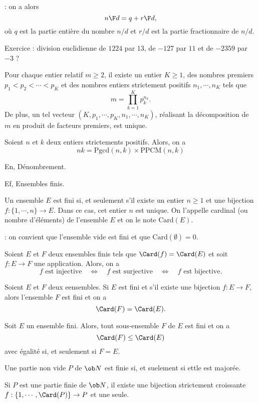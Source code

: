 \Remarque : on a alors 
$$
{n\F d}=q+{r\F d}, 
$$
où $q$ est la partie entière du nombre $n/d$ et $r/d$ est la partie fractionnaire de $n/d$. 
\bigskip

Exercice :  division euclidienne de $1224$ par $13$, de $-127$ par $11$ et de $-2359$ par $-3$ ? 
\bigskip

\Theoreme [Title=Décomposition en facteurs premiers] Pour chaque entier relatif $m\ge2$, il existe un entier $K\ge1$, 
des nombres premiers $p_1<p_2< \cdots< p_K$ et des nombres entiers strictement positifs $n_1,\cdots, n_K$ tels que 
$$
m=\prod_{k=1}^K p_k^{n_k}. 
$$
De plus, un tel vecteur $(K,p_1,\cdots, p_K, n_1,\cdots,n_K)$, réalisant la décomposition de $m$ en produit de facteurs premiers, est unique. 
\bigskip

\Propriete []  Soient $n$ et $k$ deux entiers strictements positifs. Alors, on a
$$
nk=\mbox{Pgcd}(n,k)\times \mbox{PPCM}(n,k)
$$ 

\Section En, Dénombrement. 

\Subsection Ef, Ensembles finis. 

\Definition []  Un ensemble $E$ est fini si, et seulement s'il existe un entier $n\ge1$ et une bijection $f:\{1,\cdots, n\}\to E$. 
Dans ce cas, cet entier $n$ est unique. On l'appelle cardinal (ou nombre d'éléments) de l'ensemble $E$ et on le note $\mbox{Card}(E)$. 
\bigskip

\Remarque : on convient que l'ensemble vide est fini et que $\mbox{Card}(\emptyset)=0$. 
\bigskip

\Propriete []  Soient $E$ et $F$ deux ensembles finis tels que $\Card(f)=\Card(E)$ et soit $f:E\to F$ une application. Alors, on a 
$$
f\mbox{ est injective}\quad\Longleftrightarrow\quad f\mbox{ est surjective}\quad\Longleftrightarrow\quad f\mbox{ est bijective}.
$$

\Propriete []  Soient $E$ et $F$ deux eensembles. Si $E$ est fini et s'il existe une bijection $f:E\to F$, alors l'ensemble $F$ est fini et on a 
$$
\Card(F)=\Card(E).
$$

\Propriete []  Soit $E$ un ensemble fini. Alors, tout sous-ensemble $F$ de $E$ est fini et on a 
$$
\Card(F)\le\Card(E)
$$
avec égalité si, et seulement si $F=E$.
\bigskip

\Propriete []  Une partie non vide $P$ de $\ob N$ est finie si, et suelement si ettle est majorée. 
\bigskip

 
\Propriete []  Si $P$ est une partie finie de $\ob N$, il existe une bijection strictement croissante $f:\{1,\cdots,\Card(P)\}\to P$ et une seule. 
\bigskip

